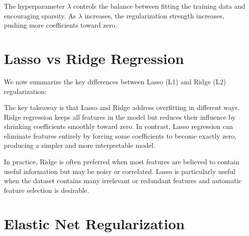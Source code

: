 \documentclass{article}
\begin{document}
The hyperparameter $\lambda$ controls the balance between fitting the training data and encouraging sparsity.  
As $\lambda$ increases, the regularization strength increases, pushing more coefficients toward zero.


\section{Lasso vs Ridge Regression}

We now summarize the key differences between Lasso (L1) and Ridge (L2) regularization:


\begin{table}[ht]
    \centering
    \caption{Comparison of Lasso and Ridge Regression}
    \label{tab:lasso_ridge}
\end{table}

The key takeaway is that Lasso and Ridge address overfitting in different ways. 
Ridge regression keeps all features in the model but reduces their influence by shrinking coefficients smoothly toward zero. 
In contrast, Lasso regression can eliminate features entirely by forcing some coefficients to become exactly zero, producing a simpler and more interpretable model.

In practice, Ridge is often preferred when most features are believed to contain useful information but may be noisy or correlated. 
Lasso is particularly useful when the dataset contains many irrelevant or redundant features and automatic feature selection is desirable.



\section{Elastic Net Regularization}
\end{document}
